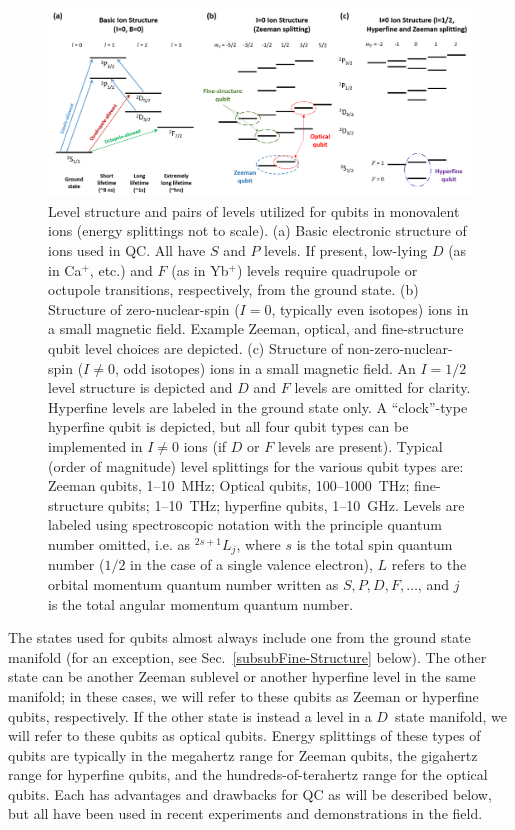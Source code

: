 \documentclass[%
12pt,
 amsmath,amssymb,
]{revtex4-2}
\begin{document}
\begin{figure}[tp]
\includegraphics[width=0.9\columnwidth]{QubitsLevelStructure_2.png}
\caption{Level structure and pairs of levels utilized for qubits in monovalent ions (energy splittings not to scale).  (a) Basic electronic structure of ions used in QC.  All have $S$ and $P$ levels.  If present, low-lying $D$ (as in Ca$^{+}$, etc.) and $F$ (as in Yb$^{+}$) levels require quadrupole or octupole transitions, respectively, from the ground state.  (b) Structure of zero-nuclear-spin ($I=0$, typically even isotopes) ions in a small magnetic field.  Example Zeeman, optical, and fine-structure qubit level choices are depicted.  (c) Structure of non-zero-nuclear-spin ($I\neq0$, odd isotopes) ions in a small magnetic field.  An $I=1/2$ level structure is depicted and $D$ and $F$ levels are omitted for clarity.  Hyperfine levels are labeled in the ground state only.  A ``clock''-type hyperfine qubit is depicted, but all four qubit types can be implemented in $I\neq0$ ions (if $D$ or $F$ levels are present).  Typical (order of magnitude) level splittings for the various qubit types are:  Zeeman qubits, 1--10~MHz; Optical qubits, 100--1000~THz; fine-structure qubits; 1--10~THz; hyperfine qubits, 1--10~GHz.  Levels are labeled using spectroscopic notation with the principle quantum number omitted, i.e. as $^{2s+1}L_{j}$, where $s$ is the total spin quantum number ($1/2$ in the case of a single valence electron), $L$ refers to the orbital momentum quantum number written as $S, P, D, F, \ldots$, and $j$ is the total angular momentum quantum number.}
\label{fig:qubit_types}
\end{figure}

The states used for qubits almost always include one from the ground state manifold (for an exception, see Sec.~\ref{subsubFine-Structure} below).  The other state can be another Zeeman sublevel or another hyperfine level in the same manifold; in these cases, we will refer to these qubits as Zeeman or hyperfine qubits, respectively.  If the other state is instead a level in a $D$~state manifold, we will refer to these qubits as optical qubits.  Energy splittings of these types of qubits are typically in the megahertz range for Zeeman qubits, the gigahertz range for hyperfine qubits, and the hundreds-of-terahertz range for the optical qubits.  Each has advantages and drawbacks for QC as will be described below, but all have been used in recent experiments and demonstrations in the field.
\end{document}
